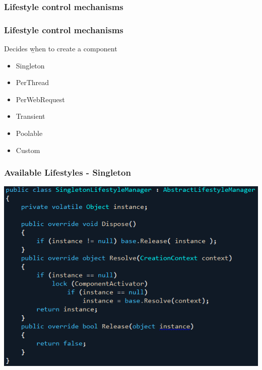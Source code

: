 \documentclass[turkish,handout]{beamer}
\begin{document}
		\subsubsection{Lifestyle control mechanisms}
			  \frame
				{
					\frametitle{Lifestyle control mechanisms}
					Decides \b{when} to create a component
			  	\begin{itemize}
			  	  \item<1->Singleton
			  	  \item<2->PerThread
			  	  \item<3->PerWebRequest
			  	  \item<4->Transient
			  	  \item<5->Poolable
			  	  \item<6->Custom
			  	\end{itemize}
			 }
			 \frame
			{
				\frametitle{Available Lifestyles - Singleton}
				\begin{center}
						\includegraphics[scale=0.50]{images/singletonlifestylemanager.png}
				\end{center}
	    }
\end{document}
